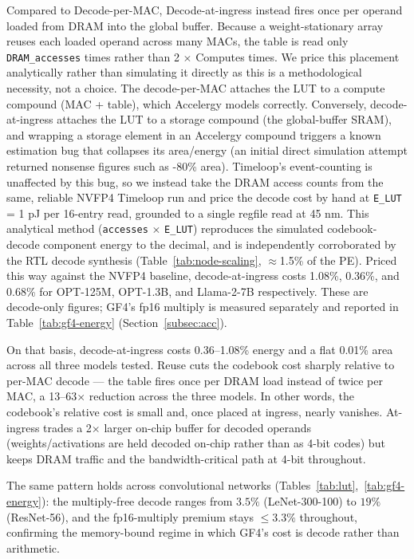 Compared to Decode-per-MAC, Decode-at-ingress instead fires once per operand
loaded from DRAM into the global buffer. Because a weight-stationary array reuses
each loaded operand across many MACs, the table is read only \verb|DRAM_accesses|
times rather than 2 $\times$ Computes times. We price this placement analytically
rather than simulating it directly as this is a methodological necessity, not a
choice. The decode-per-MAC attaches the LUT to a compute compound (MAC + table),
which Accelergy models correctly. Conversely, decode-at-ingress attaches the LUT
to a storage compound (the global-buffer SRAM), and wrapping a storage element in
an Accelergy compound triggers a known estimation bug that collapses its
area/energy (an initial direct simulation attempt returned nonsense figures such
as -80\% area). Timeloop's event-counting is unaffected by this bug, so we
instead take the DRAM access counts from the same, reliable NVFP4 Timeloop run
and price the decode cost by hand at \verb|E_LUT| = 1 pJ per 16-entry read,
grounded to a single regfile read at 45 nm. This analytical method
(\verb|accesses| $\times$ \verb|E_LUT|) reproduces the simulated codebook-decode
component energy to the decimal, and is independently corroborated by the RTL
decode synthesis (Table~\ref{tab:node-scaling}, $\approx$1.5\% of the PE). Priced
this way against the NVFP4 baseline, decode-at-ingress costs 1.08\%, 0.36\%, and
0.68\% for OPT-125M, OPT-1.3B, and Llama-2-7B respectively. These are decode-only
figures; GF4's fp16 multiply is measured separately and reported in
Table~\ref{tab:gf4-energy} (Section~\ref{subsec:acc}).

On that basis, decode-at-ingress costs 0.36--1.08\% energy and a flat 0.01\% area
across all three models tested. Reuse cuts the codebook cost sharply relative to
per-MAC decode --- the table fires once per DRAM load instead of twice per MAC, a
13--63$\times$ reduction across the three models. In other words, the codebook's
relative cost is small and, once placed at ingress, nearly vanishes. At-ingress trades a 2$\times$ larger
on-chip buffer for decoded operands (weights/activations are held decoded on-chip
rather than as 4-bit codes) but keeps DRAM traffic and the bandwidth-critical
path at 4-bit throughout.

The same pattern holds across convolutional networks
(Tables~\ref{tab:lut},~\ref{tab:gf4-energy}): the multiply-free decode ranges
from $3.5\%$ (LeNet-300-100) to $19\%$ (ResNet-56), and the fp16-multiply premium
stays $\le 3.3\%$ throughout, confirming the memory-bound regime in which GF4's
cost is decode rather than arithmetic.

